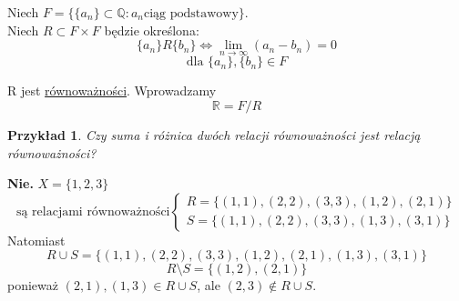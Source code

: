 \documentclass[a5paper,8pt]{article}
\theoremstyle{mythmstyle}
\newtheorem*{example}{Przykład}
\begin{document}
\begin{enumerate}
                Niech $ F = \{ \{ a_n \} \subset \mathbb{Q} : a_n \text{ciąg podstawowy} \} $.\\

                Niech $ R \subset F \times F $ będzie określona:
                \begin{equation*}
                    \{ a_n \} R \{ b_n \} \iff \lim_{n \rightarrow \infty}(a_n - b_n) = 0
                \end{equation*}
                \begin{equation*}
                \text{dla   } \{ a_n \}, \{ b_n \} \in F
                \end{equation*}

                R jest \underline{równoważności}. Wprowadzamy
                \begin{equation*}
                    \mathbb{R} = F / R
                \end{equation*}
            \end{enumerate}


            \begin{example}
                Czy suma i różnica dwóch relacji równoważności jest relacją równoważności?
            \end{example}

            \textbf{Nie.} $ X = \{ 1, 2, 3 \} $\\
            \begin{equation*}
                \text{są relacjami równoważności}\begin{cases}
                    R = \{ (1, 1), (2, 2), (3, 3), (1, 2), (2, 1) \}\\
                    S = \{ (1, 1), (2, 2), (3, 3), (1, 3), (3, 1) \}
                \end{cases}
            \end{equation*}
            Natomiast
            \begin{equation*}
                R \cup S = \{ (1, 1), (2, 2), (3, 3), (1, 2), (2, 1), (1, 3), (3, 1) \}
            \end{equation*}
            \begin{equation*}
                R \setminus S = \{ (1, 2), (2, 1) \}
            \end{equation*}
            ponieważ $ (2, 1), (1, 3) \in R \cup S $, ale $ (2, 3) \notin R \cup S $.
\end{document}
